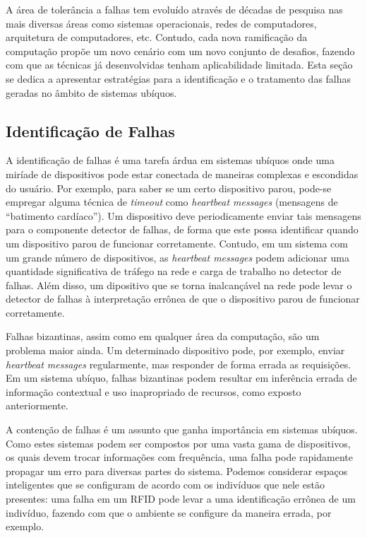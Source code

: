 A área de tolerância a falhas tem evoluído através de décadas de pesquisa nas mais diversas áreas como sistemas operacionais, redes de computadores, arquitetura de computadores, etc. Contudo, cada nova ramificação da computação propõe um novo cenário com um novo conjunto de desafios, fazendo com que as técnicas já desenvolvidas tenham aplicabilidade limitada. Esta seção se dedica a apresentar estratégias para a identificação e o tratamento das falhas geradas no âmbito de sistemas ubíquos.

\subsection{Identificação de Falhas} %
\label{sub:identificacao}

A identificação de falhas é uma tarefa árdua em sistemas ubíquos onde uma miríade de dispositivos pode estar conectada de maneiras complexas e escondidas do usuário. Por exemplo, para saber se um certo dispositivo parou, pode-se empregar alguma técnica de \emph{timeout} como \emph{heartbeat messages} (mensagens de ``batimento cardíaco''). Um dispositivo deve periodicamente enviar tais mensagens para o componente detector de falhas, de forma que este possa identificar quando um dispositivo parou de funcionar corretamente. Contudo, em um sistema com um grande número de dispositivos, as \emph{heartbeat messages} podem adicionar uma quantidade significativa de tráfego na rede e carga de trabalho no detector de falhas. Além disso, um dipositivo que se torna inalcançável na rede pode levar o detector de falhas à interpretação errônea de que o dispositivo parou de funcionar corretamente.

Falhas bizantinas, assim como em qualquer área da computação, são um problema maior ainda. Um determinado dispositivo pode, por exemplo, enviar \emph{heartbeat messages} regularmente, mas responder de forma errada as requisições. Em um sistema ubíquo, falhas bizantinas podem resultar em inferência errada de informação contextual e uso inapropriado de recursos, como exposto anteriormente.

A contenção de falhas é um assunto que ganha importância em sistemas ubíquos. Como estes sistemas podem ser compostos por uma vasta gama de dispositivos, os quais devem trocar informações com frequência, uma falha pode rapidamente propagar um erro para diversas partes do sistema. Podemos considerar espaços inteligentes que se configuram de acordo com os indivíduos que nele estão presentes: uma falha em um RFID pode levar a uma identificação errônea de um indivíduo, fazendo com que o ambiente se configure da maneira errada, por exemplo.

